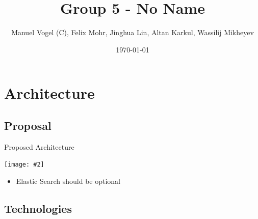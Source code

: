 \documentclass{beamer}
\title{Group 5 - \textbf{No Name}}
\author[]{Manuel Vogel (C), Felix Mohr,  Jinghua Lin,  Altan Karkul, Wassilij Mikheyev}
\institute{Graphical User Interfaces Lab}
\date{\today}
\newcommand{\cgraphic}[2]
{
	\begin{center}
		\texttt{[image: \#2]}
	\end{center}
}%
\begin{document}
\frame{\titlepage}

\section{Architecture}
\subsection{Proposal}
\begin{frame}{Proposed Architecture}
		\cgraphic{.06}{architecture_proposal}
		\begin{itemize}
			\item Elastic Search should be optional
		\end{itemize}
\end{frame}
\subsection{Technologies}
\end{document}
